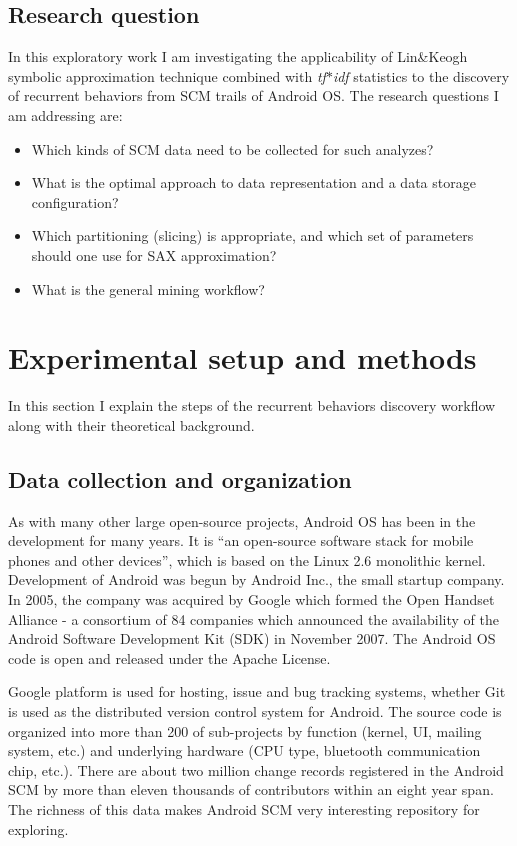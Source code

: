 \documentclass[conference]{worldcomp}
\begin{document}
\subsection{Research question}
In this exploratory work I am investigating the applicability of Lin\&Keogh 
symbolic approximation technique combined with \textit{tf$\ast$idf} statistics to the discovery of 
recurrent behaviors from SCM trails of Android OS.
The research questions I am addressing are: 
\begin{itemize}
 \item Which kinds of SCM data need to be collected for such analyzes?
 \item What is the optimal approach to data representation and a data storage configuration?
 \item Which partitioning (slicing) is appropriate, and which set of parameters should one use for SAX approximation?
 \item What is the general mining workflow?
\end{itemize}

\section{Experimental setup and methods}
In this section I explain the steps of the recurrent behaviors discovery workflow 
along with their theoretical background.

\subsection{Data collection and organization}
As with many other large open-source projects, Android OS has been in the development for many years. 
It is ``an open-source software stack for mobile phones and other 
devices'', which is based on the Linux 2.6 monolithic kernel.
Development of Android was begun by Android Inc., the small startup company.
In 2005, the company was acquired by Google which formed the Open Handset Alliance - a consortium of 84 companies 
which announced the availability of the Android Software Development Kit (SDK) 
in November 2007. The Android OS code is open and released under the Apache License.

Google platform is used for hosting, issue and bug tracking systems, whether Git is used 
as the distributed version control system for Android. The source code is organized 
into more than 200 of sub-projects by function (kernel, UI, mailing system, etc.) 
and underlying hardware (CPU type, bluetooth communication chip, etc.). 
There are about two million change records registered in the Android SCM by more than 
eleven thousands of contributors within an eight year span. The richness of this data 
makes Android SCM very interesting repository for exploring.
\end{document}

